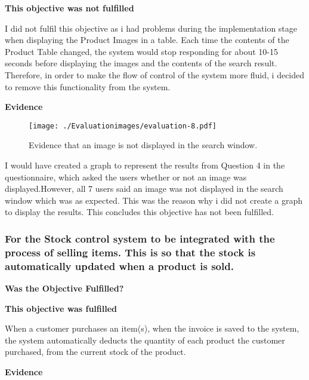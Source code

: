 \textbf{\large{This objective was not fulfilled}}

I did not fulfil this objective as i had problems during the implementation stage when displaying the Product Images in a table. Each time the contents of the Product Table changed, the system would stop responding for about 10-15 seconds before displaying the images and the contents of the search result. Therefore, in order to make the flow of control of the system more fluid, i decided to remove this functionality from the system. \newline

\textbf{Evidence} \newline

\begin{figure}[H]
\caption{Evidence that an image is not displayed in the search window.} \label{fig:evaluation-8}
\hfill\texttt{[image: ./Evaluationimages/evaluation-8.pdf]}
\end{figure}

I would have created a graph to represent the results from Question 4 in the questionnaire, which asked the users whether or not an image was displayed.However, all 7 users said an image was not displayed in the search window which was as expected. This was the reason why i did not create a graph to display the results.  This concludes this objective has not been fulfilled.



\pagebreak
\subsubsection{For the Stock control system to be integrated with the process of selling items. This is so that the stock is automatically updated when a product is sold.}
\label{For the Stock control system to be integrated with the process of selling items. This is so that the stock is automatically updated when a product is sold.}
\textbf{Was the Objective Fulfilled?} \newline

\textbf{\large{This objective was fulfilled}}

When a customer purchases an item(s), when the invoice is saved to the system, the system automatically deducts the quantity of each product the customer purchased, from the current stock of the product.\newline

\textbf{Evidence} \newline
\label{automatic-stock-evidence}

